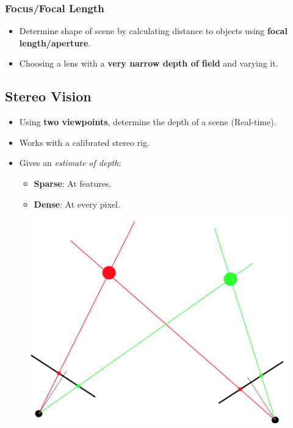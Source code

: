 \documentclass[english, 10pt]{article}
\begin{document}
\subsubsection{Focus/Focal Length}

\begin{itemize}
\item Determine shape of scene by calculating distance to objects using \textbf{focal length/aperture}. 
\item Choosing a lens with a \textbf{very narrow depth of field} and varying it. 
\end{itemize}

\subsection{Stereo Vision}

\begin{itemize}
\item Using \textbf{two viewpoints}, determine the depth of a scene (Real-time).
\item Works with a calibrated stereo rig.
\item Gives an \textit{estimate of depth}:
\begin{itemize}
\item \textbf{Sparse}: At features.
\item \textbf{Dense}: At every pixel.
\end{itemize}
\end{itemize}

\begin{figure}[ht!]      
	\centering 
	\includegraphics[scale=0.3]{stereo.png}
\end{figure}
\end{document}
